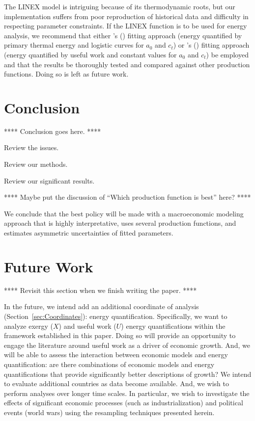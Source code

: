 \documentclass[preprint,authoryear,12pt]{elsarticle}\usepackage[]{graphicx}\usepackage[]{color}
\newcommand{\citeapos}[1]{\citeauthor{#1}'s (\citeyear{#1})} %
\begin{document}
The LINEX model is intriguing because of its thermodynamic roots, 
but our implementation suffers from 
poor reproduction of historical data and
difficulty in respecting parameter constraints.
If the LINEX function is to be used for energy analysis, 
we recommend that either \citeapos{Kummel:2011aa} fitting approach 
(energy quantified by primary thermal energy and logistic curves for $a_0$ and $c_t$) 
or \citeapos{Ayres:2010ug} fitting approach 
(energy quantified by useful work and constant values for $a_0$ and $c_t$) 
be employed 
and that the results be 
thoroughly tested and compared 
against other production functions.
Doing so is left as future work.


\section{Conclusion}
\label{sec:Conclusion}

**** Conclusion goes here.  ****

Review the issues.

Review our methods.

Review our significant results.

**** Maybe put the discussion of ``Which production function is best'' here? ****
 
We conclude that the best policy will be made 
with a macroeconomic modeling approach that is highly interpretative, 
uses several production functions, and 
estimates asymmetric uncertainties of fitted parameters.


\section{Future Work}
\label{sec:FutureWork}

**** Revisit this section when we finish writing the paper. ****

In the future, we intend add an additional coordinate of analysis 
(Section~\ref{sec:Coordinates}):
energy quantification.
Specifically, we want to analyze exergy ($X$) and useful work ($U$)
energy quantifications within the framework established in this paper.
Doing so will provide an opportunity to engage the 
literature around useful work as a driver 
of economic growth.\citep{Ayres:2003ec, Ayres:2005kn, Ayres:2010ug, 
Warr:2006hc, Warr:2010ga, Warr:2010ht, Warr:2012cg}
And, we will be able to assess the interaction between economic models
and energy quantification:
are there combinations of economic models and energy quantifications
that provide significantly better descriptions of growth?
We intend to evaluate additional countries as data become available.
And, we wish to perform analyses over longer time scales.
In particular, we wish to investigate the effects of significant 
economic processes (such as industrialization) and political events (world wars)
using the resampling techniques presented herein.
\end{document}
